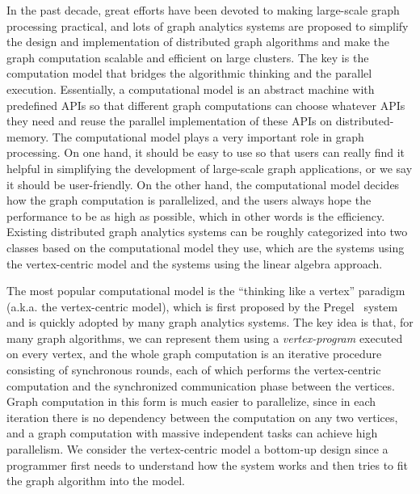 \documentclass{sokendai_thesis} %
\begin{document}
In the past decade, great efforts have been devoted to making large-scale graph processing practical, and lots of graph analytics systems are proposed to simplify the design and implementation of distributed graph algorithms and make the graph computation scalable and efficient on large clusters.
The key is the computation model that bridges the algorithmic thinking and the parallel execution.
Essentially, a computational model is an abstract machine with predefined APIs so that different graph computations can choose whatever APIs they need and reuse the parallel implementation of these APIs on distributed-memory.
The computational model plays a very important role in graph processing.
On one hand, it should be easy to use so that users can really find it helpful in simplifying the development of large-scale graph applications, or we say it should be user-friendly.
On the other hand, the computational model decides how the graph computation is parallelized, and the users always hope the performance to be as high as possible, which in other words is the efficiency.
Existing distributed graph analytics systems can be roughly categorized into two classes based on the computational model they use, which are the systems using the vertex-centric model and the systems using the linear algebra approach.


The most popular computational model is the ``thinking like a vertex'' paradigm (a.k.a. the vertex-centric model), which is first proposed by the Pregel~\cite{pregel} system and is quickly adopted by many graph analytics systems\cite{survey,survey2}.
The key idea is that, for many graph algorithms, we can represent them using a \emph{vertex-program} executed on every vertex, and the whole graph computation is an iterative procedure consisting of synchronous rounds, each of which performs the vertex-centric computation and the synchronized communication phase between the vertices.
Graph computation in this form is much easier to parallelize, since in each iteration there is no dependency between the computation on any two vertices, and a graph computation with massive independent tasks can achieve high parallelism.
We consider the vertex-centric model a bottom-up design since a programmer first needs to understand how the system works and then tries to fit the graph algorithm into the model.
\end{document}
